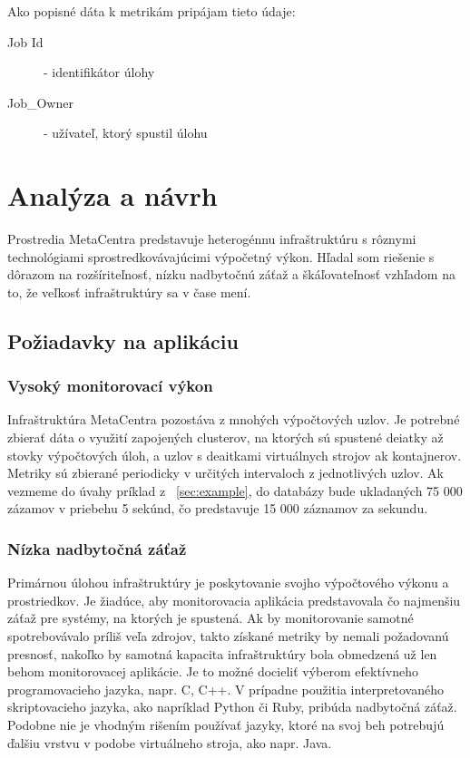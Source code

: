 \documentclass[printed,11pt,twoside,color,cover,table]{fithesis3}
\begin{document}
Ako popisné dáta k metrikám pripájam tieto údaje:
\begin{description}
\item[Job Id] - identifikátor úlohy
\item[Job\_Owner] - užívateľ, ktorý spustil úlohu
\end{description}

\chapter{Analýza a návrh}
Prostredia MetaCentra predstavuje heterogénnu infraštruktúru s rôznymi technológiami sprostredkovávajúcimi výpočetný výkon. Hľadal som riešenie s dôrazom na rozšíriteľnosť, 
nízku nadbytočnú záťaž a škáľovateľnosť vzhľadom na to, že veľkosť infraštruktúry sa v čase mení.

\section{Požiadavky na aplikáciu}
\subsection{Vysoký monitorovací výkon}
Infraštruktúra MetaCentra pozostáva z mnohých výpočtových uzlov. Je potrebné zbierať dáta o využití zapojených
clusterov, na ktorých sú spustené deiatky až stovky výpočtových úloh, a uzlov s deaitkami virtuálnych strojov ak kontajnerov. Metriky sú zbierané periodicky v určitých intervaloch z jednotlivých uzlov. 
Ak vezmeme do úvahy príklad z ~\ref{sec:example}, do databázy bude ukladaných 75 000 zázamov v priebehu 5 sekúnd, čo predstavuje 15 000 záznamov za sekundu. 

\subsection{Nízka nadbytočná záťaž}
Primárnou úlohou infraštruktúry je poskytovanie svojho výpočtového výkonu a prostriedkov. Je žiadúce, aby monitorovacia aplikácia predstavovala čo najmenšiu záťaž pre systémy, na ktorých je spustená. Ak by monitorovanie
samotné spotrebovávalo príliš veľa zdrojov, takto získané metriky by nemali požadovanú presnosť, nakoľko by samotná kapacita infraštruktúry bola obmedzená už len behom
monitorovacej aplikácie. Je to možné docieliť výberom efektívneho programovacieho jazyka, napr. C, C++. V prípadne použitia interpretovaného skriptovacieho jazyka, ako napríklad Python či Ruby, pribúda 
nadbytočná záťaž. Podobne nie je vhodným rišením používať jazyky, ktoré na svoj beh potrebujú ďalšiu vrstvu v podobe virtuálneho stroja, ako napr. Java.
\end{document}
